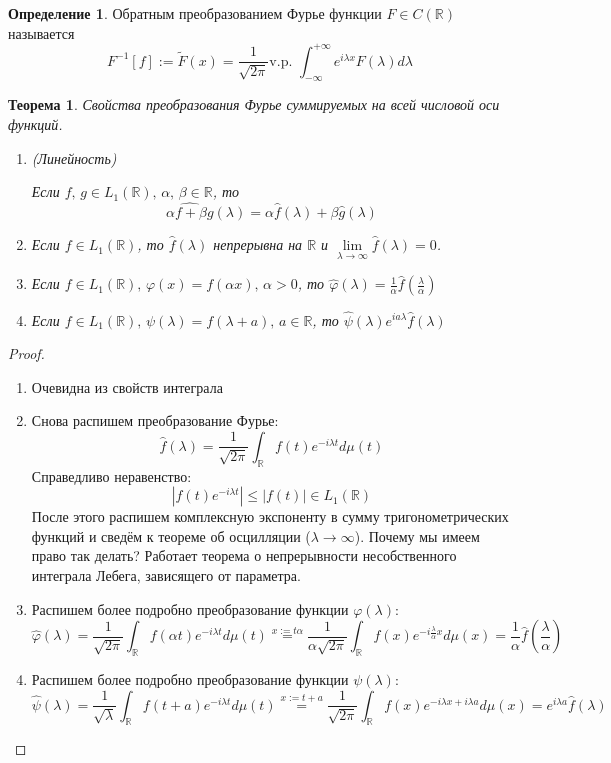 \documentclass[a4paper,12pt]{article}
\renewcommand{\phi}{\ensuremath{\varphi}}
\renewcommand{\leq}{\ensuremath{\leqslant}}
\theoremstyle{plain}
\newtheorem{theorem}{Теорема}[section]
\theoremstyle{definition}
\newtheorem{definition}{Определение}[section]
\theoremstyle{remark}
\begin{document}
\begin{definition}
	Обратным преобразованием Фурье функции $F \in C(\mathbb{R})$ называется
	\[F^{-1}[f] := \tilde{F}(x) = \frac{1}{\sqrt{2\pi}} \text{v.p. }\int_{-\infty}^{+\infty}e^{i\lambda x}F(\lambda)d\lambda\]
\end{definition}

\begin{theorem}
	Свойства преобразования Фурье суммируемых на всей числовой оси функций.

	\begin{enumerate}
		\item (Линейность)

		      Если $f,\,g \in L_1(\mathbb{R}),\, \alpha,\, \beta \in \mathbb{R}$, то
		      \[\widehat{\alpha f + \beta g}(\lambda) = \alpha\hat{f}(\lambda) + \beta\hat{g}(\lambda)\]
		\item Если $f \in L_1(\mathbb{R})$, то $\hat{f}(\lambda)$ непрерывна на $\mathbb{R}$ и $\lim\limits_{\lambda \to \infty}\hat{f}(\lambda) = 0$.
		\item Если $f \in L_1(\mathbb{R}),\, \phi(x) = f(\alpha x),\, \alpha > 0$, то $\hat{\phi}(\lambda) = \frac{1}{\alpha}\hat{f}(\frac{\lambda}{\alpha})$
		\item Если $f \in L_1(\mathbb{R}),\, \psi(\lambda) = f(\lambda + a),\, a \in \mathbb{R}$, то $\hat{\psi}(\lambda)e^{ia\lambda}\hat{f}(\lambda)$
	\end{enumerate}
\end{theorem}
\begin{proof}
	\begin{enumerate}
		\item Очевидна из свойств интеграла
		\item Снова распишем преобразование Фурье:
		      \[\hat{f}(\lambda) = \frac{1}{\sqrt{2\pi}}\int_\mathbb{R} f(t)e^{-i\lambda t}d\mu(t)\]
		      Справедливо неравенство:
		      \[|f(t)e^{-i\lambda t}| \leq |f(t)| \in L_1(\mathbb{R})\]
		      После этого распишем комплексную экспоненту в сумму тригонометрических функций и сведём к теореме об осцилляции ($\lambda \to \infty$). Почему мы имеем право так делать? Работает теорема о непрерывности несобственного интеграла Лебега, зависящего от параметра.
		\item Распишем более подробно преобразование функции $\phi(\lambda)$:
		      \[\hat{\phi}(\lambda) = \frac{1}{\sqrt{2\pi}}\int_\mathbb{R} f(\alpha t)e^{-i\lambda t}d\mu(t) \stackrel{x := t\alpha}{=} \frac{1}{\alpha\sqrt{2\pi}}\int_\mathbb{R}f(x)e^{-i\frac{\lambda}{\alpha}x}d\mu(x) = \frac{1}{\alpha}\hat{f}(\frac{\lambda}{\alpha})\]
		\item Распишем более подробно преобразование функции $\psi(\lambda)$:
		      \[\hat{\psi}(\lambda) = \frac{1}{\sqrt{\lambda}}\int_\mathbb{R} f(t + a)e^{-i\lambda t}d\mu(t) \stackrel{x := t + a}{=} \frac{1}{\sqrt{2\pi}}\int_\mathbb{R}f(x)e^{-i\lambda x + i\lambda a}d\mu(x) = e^{i\lambda a}\hat{f}(\lambda)\]
	\end{enumerate}
\end{proof}
\end{document}
